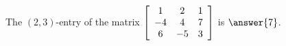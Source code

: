 \documentclass{ximera}
\author{Zack Reed}
\begin{document}
  
\begin{problem}
  The $(2,3)$-entry of the matrix $\startmat{ccc}
    1 & 2 & 1 \\
    -4 & 4 & 7 \\
    6 & -5 & 3
  \stopmat$ is $\answer{7}$.
  
\end{problem}
\end{document}
